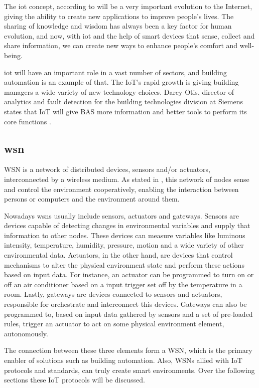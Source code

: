 The \ac{iot} concept, according to \cite{Evans2011} will be a very important evolution to the Internet, giving the ability to create new applications to improve people's lives. The sharing of knowledge and wisdom has always been a key factor for human evolution, and now, with \ac{iot} and the help of smart devices that sense, collect and share information, we can create new ways to enhance people's comfort and well-being.

\ac{iot} will have an important role in a vast number of sectors, and building automation is an example of that. The IoT's rapid growth is giving building managers a wide variety of new technology choices. Darcy Otis, director of analytics and fault detection for the building technologies division at Siemens states that IoT will give BAS more information and better tools to perform its core functions \cite{biot}.


\subsection{\acf{wsn}}

WSN is a network of distributed devices, sensors and/or actuators, interconnected by a wireless medium. As stated in \cite{IEC2014a}, this network of nodes sense and control the environment cooperatively, enabling the interaction between persons or computers and the environment around them. 

Nowadays \ac{wsn}s usually include sensors, actuators and gateways. Sensors are devices capable of detecting changes in environmental variables and supply that information to other nodes. These devices can measure variables like luminous intensity, temperature, humidity, pressure, motion and a wide variety of other environmental data. Actuators, in the other hand, are devices that control mechanisms to alter the physical environment state and perform these actions based on input data. For instance, an actuator can be programmed to turn on or off an air conditioner based on a input trigger set off by the temperature in a room.
Lastly, gateways are devices connected to sensors and actuators, responsible for orchestrate and interconnect this devices. Gateways can also be programmed to, based on input data gathered by sensors and a set of pre-loaded rules, trigger an actuator to act on some physical environment element, autonomously.

The connection between these three elements form a WSN, which is the primary enabler of solutions such as building automation. Also, WSNs allied with IoT protocols and standards, can truly create smart environments. Over the following sections these IoT protocols will be discussed.


